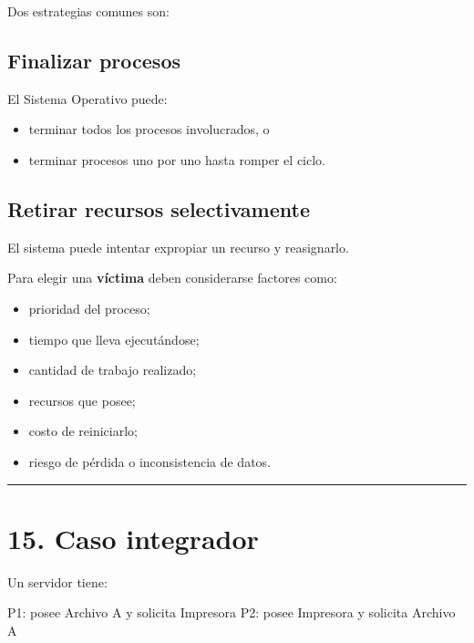 \documentclass[
  spanish,
  letterpaper,
]{scrbook}
\newenvironment{Shaded}{\begin{snugshade}}{\end{snugshade}}
\newcommand{\NormalTok}[1]{\textcolor[rgb]{0.00,0.23,0.31}{#1}}
\providecommand{\tightlist}{%
  \setlength{\itemsep}{0pt}\setlength{\parskip}{0pt}}
\begin{document}
Dos estrategias comunes son:

\section{Finalizar procesos}\label{finalizar-procesos}

El Sistema Operativo puede:

\begin{itemize}
\tightlist
\item
  terminar todos los procesos involucrados, o
\item
  terminar procesos uno por uno hasta romper el ciclo.
\end{itemize}

\section{Retirar recursos
selectivamente}\label{retirar-recursos-selectivamente}

El sistema puede intentar expropiar un recurso y reasignarlo.

Para elegir una \textbf{víctima} deben considerarse factores como:

\begin{itemize}
\tightlist
\item
  prioridad del proceso;
\item
  tiempo que lleva ejecutándose;
\item
  cantidad de trabajo realizado;
\item
  recursos que posee;
\item
  costo de reiniciarlo;
\item
  riesgo de pérdida o inconsistencia de datos.
\end{itemize}

\begin{center}\rule{0.5\linewidth}{0.5pt}\end{center}


\chapter{15. Caso integrador}\label{caso-integrador-2}

Un servidor tiene:

\begin{Shaded}
\begin{Highlighting}[]
\NormalTok{P1: posee Archivo A y solicita Impresora}
\NormalTok{P2: posee Impresora y solicita Archivo A}
\end{Highlighting}
\end{Shaded}
\end{document}
